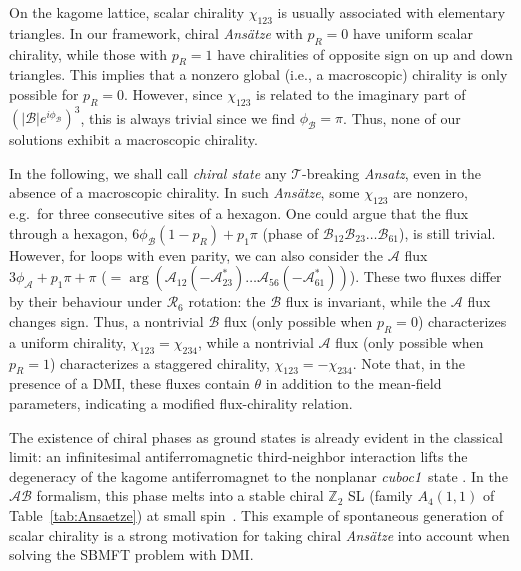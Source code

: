 \documentclass[aps,prl,twocolumn,superscriptaddress,showpacs,a4paper, longbibliography]{revtex4-1}
\newcommand{\cuboc}{\textit{cuboc1}}
\begin{document}
On the kagome lattice, scalar chirality $\chi_{123}$ is usually associated with elementary triangles.
In our framework, chiral \textit{Ans\"atze} with $p_R=0$ have uniform scalar chirality, while those with $p_R=1$ have chiralities of opposite sign on up and down triangles.
This implies that a nonzero global (i.e., a macroscopic) chirality is only possible for $p_R=0$. However, since $\chi_{123}$ is related to the imaginary part of $(|\mathcal B| e^{i\phi_\mathcal B})^3$, this is always trivial since we find $\phi_\mathcal B=\pi$.
Thus, none of our solutions exhibit a macroscopic chirality.

In the following, we shall call \textit{chiral state} any $\mathcal T$-breaking \textit{Ansatz}, even in the absence of a macroscopic chirality.
In such \textit{Ans\"atze}, some $\chi_{123}$ are nonzero, e.g.\ for three consecutive sites of a hexagon.
One could argue that the flux through a hexagon, $6\phi_\mathcal B(1-p_R)+p_1\pi$ (phase of $\mathcal B_{12}\mathcal B_{23}\dots\mathcal B_{61}$), is still trivial.
However, for loops with even parity, we can also consider the $\mathcal A$ flux $3\phi_\mathcal A+p_1\pi+\pi$ ($= \arg(\mathcal A_{12}(-\mathcal A^*_{23})\dots \mathcal A_{56}(-\mathcal A_{61}^*))$).
These two fluxes differ by their behaviour under $\mathcal R_6$ rotation:
the $\mathcal B$ flux is invariant, while the $\mathcal A$ flux changes sign.
Thus, a nontrivial $\mathcal B$ flux (only possible when $p_R=0$) characterizes a uniform chirality, $\chi_{123} = \chi_{234}$, while a nontrivial $\mathcal A$ flux (only possible when $p_R=1$) characterizes a staggered chirality, $\chi_{123}=-\chi_{234}$.
Note that, in the presence of a DMI, these fluxes contain $\theta$ in addition to the mean-field parameters, indicating a modified flux-chirality relation.

The existence of chiral phases as ground states \cite{Wen_Wilczek, PhysRevLett.70.2641, Hu2015_PRB.91.041124} is already evident in the classical limit: an infinitesimal antiferromagnetic third-neighbor interaction lifts the degeneracy of the kagome antiferromagnet to the nonplanar \cuboc\ state \cite{Regular_order}.
In the $\mathcal A \mathcal B$ formalism, this phase melts into a stable chiral $\mathbb Z_2$ SL (family $A_4(1,1)$ of Table~\ref{tab:Ansaetze}) at small spin~\cite{cuboc1}.
This example of spontaneous generation of scalar chirality is a strong motivation for taking chiral \textit{Ans\"atze} into account when solving the SBMFT problem with DMI.
\end{document}
